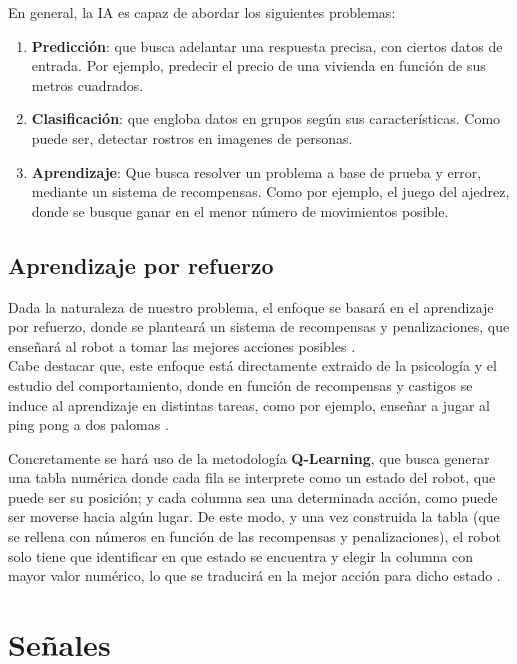 En general, la \ac{IA} es capaz de abordar los siguientes problemas:

\begin{enumerate}
	\item \textbf{Predicción}: que busca adelantar una respuesta precisa, con ciertos datos de entrada. Por ejemplo, predecir el precio de una vivienda en función de sus metros cuadrados.

	\item \textbf{Clasificación}: que engloba datos en grupos según sus características. Como puede ser, detectar rostros en imagenes de personas.
	
    \item \textbf{Aprendizaje}: Que busca resolver un problema a base de prueba y error, mediante un sistema de recompensas. Como por ejemplo, el juego del ajedrez, donde se busque ganar en el menor número de movimientos posible.
\end{enumerate} \cite{reg-class}

\subsection{Aprendizaje por refuerzo}
\label{subsec:aprendizaje_por_refuerzo}

Dada la naturaleza de nuestro problema, el enfoque se basará en el aprendizaje por refuerzo, donde se planteará un sistema de recompensas y penalizaciones, que enseñará al robot a tomar las mejores acciones posibles \cite{learn}.\\

Cabe destacar que, este enfoque está directamente extraido de la psicología y el estudio del comportamiento, donde en función de recompensas y castigos se induce al aprendizaje en distintas tareas, como por ejemplo, enseñar a jugar al ping pong a dos palomas \cite{psicologia-aprendizaje}.

Concretamente se hará uso de la metodología \textbf{Q-Learning}, que busca generar una tabla numérica donde cada fila se interprete como un estado del robot, que puede ser su posición; y cada columna sea una determinada acción, como puede ser moverse hacia algún lugar. De este modo, y una vez construida la tabla (que se rellena con números en función de las recompensas y penalizaciones), el robot solo tiene que identificar en que estado se encuentra y elegir la columna con mayor valor numérico, lo que se traducirá en la mejor acción para dicho estado \cite{q-learning}.

\section{Señales}
\label{subsec:señales}

